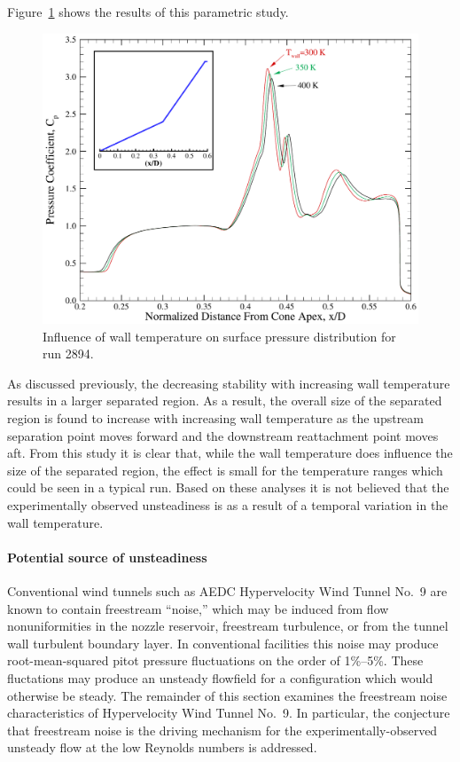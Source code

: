 Figure~\ref{fig:double_cone_AEDC_2894_Twall} shows the results of this parametric study.
\begin{figure}[hbtp]
  \begin{center}
    \includegraphics[width=\textwidth]{figures/aedc_double_cone/2894/twall_Cp_comp}
    \caption{Influence of wall temperature on surface pressure distribution for run 2894.\label{fig:double_cone_AEDC_2894_Twall}}
  \end{center}
\end{figure}
As discussed previously, the decreasing stability with increasing wall temperature results in a larger separated region.  As a result, the overall size of the separated region is found to increase with increasing wall temperature as the upstream separation point moves forward and the downstream reattachment point moves aft.  From this study it is clear that, while the wall temperature does influence the size of the separated region, the effect is small for the temperature ranges which could be seen in a typical run.  Based on these analyses it is not believed that the experimentally observed unsteadiness is as a result of a temporal variation in the wall temperature.


\paragraph{Potential source of unsteadiness\label{sec:comp_ns_double_cone_unsteady}}

Conventional wind tunnels such as AEDC Hypervelocity Wind Tunnel No.~9 are known to contain freestream ``noise,'' which may be induced from flow nonuniformities in the nozzle reservoir, freestream turbulence, or from the tunnel wall turbulent boundary layer.  In conventional facilities this noise may produce root-mean-squared pitot pressure fluctuations on the order of 1\%--5\%.  These fluctations may produce an unsteady flowfield for a configuration which would otherwise be steady.  The remainder of this section examines the freestream noise characteristics of Hypervelocity Wind Tunnel No.~9.  In particular, the conjecture that freestream noise is the driving mechanism for the experimentally-observed unsteady flow at the low Reynolds numbers is addressed.

